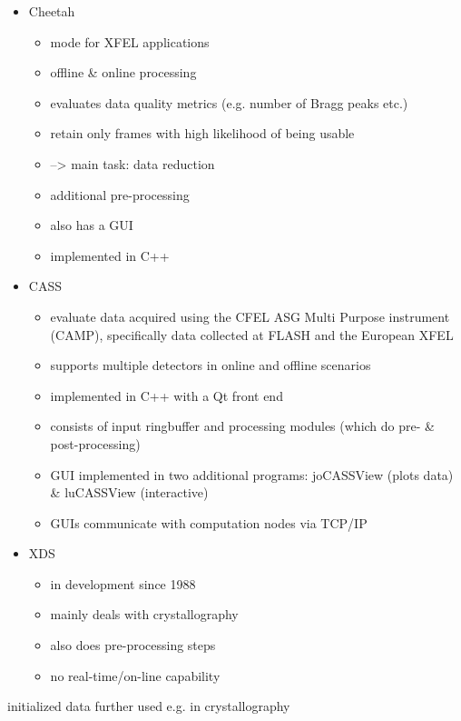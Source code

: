 \documentclass[a4paper]{article}
\begin{document}
{\begin{itemize}
\begin{itemize}
		\item designed to give fast online feedback
	\end{itemize}
	\item Cheetah \cite{barty2014cheetah}
	\begin{itemize}
		\item mode for XFEL applications
		\item offline \& online processing
		\item evaluates data quality metrics (e.g. number of Bragg peaks etc.)
		\item retain only frames with high likelihood of being usable
		\item --> main task: data reduction
		\item additional pre-processing
		\item also has a GUI
		\item implemented in C++
	\end{itemize}
	\item CASS \cite{foucar2012cass}
	\begin{itemize}
		\item evaluate data acquired using the CFEL ASG Multi Purpose instrument (CAMP), specifically data collected at FLASH and the European XFEL
		\item supports multiple detectors in online and offline scenarios
		\item implemented in C++ with a Qt front end
		\item consists of input ringbuffer and processing modules (which do pre- \& post-processing)
		\item GUI implemented in two additional programs: joCASSView (plots data) \& luCASSView (interactive)
		\item GUIs communicate with computation nodes via TCP/IP
	\end{itemize}
	\item XDS \cite{kabsch2010xds}
	\begin{itemize}
		\item in development since 1988
		\item mainly deals with crystallography
		\item also does pre-processing steps
		\item no real-time/on-line capability
	\end{itemize}
\end{itemize}
initialized data further used e.g. in crystallography \cite{kabsch2010integration} \cite{white2012crystfel} \cite{grosse2002computational}}\\
\end{document}
